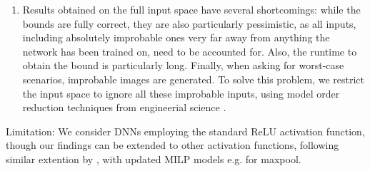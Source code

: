 \begin{enumerate}
	\item Results obtained on the full input space have several shortcomings: while the bounds are fully correct, they are also particularly pessimistic, as all inputs, including absolutely improbable ones very far away from anything the network has been trained on, need to be accounted for. Also, the runtime to obtain the bound is particularly long. Finally, when asking for worst-case 
	scenarios, improbable images are generated. To solve this problem, we restrict the input space to ignore all these improbable inputs, using model order reduction techniques from engineerial science \cite{aiware}.
	
\end{enumerate}

Limitation: We consider DNNs employing the standard ReLU activation function, though our findings can be extended to other activation functions, following similar extention by \cite{DivideAndSlide}, with updated MILP models e.g. for maxpool. 




